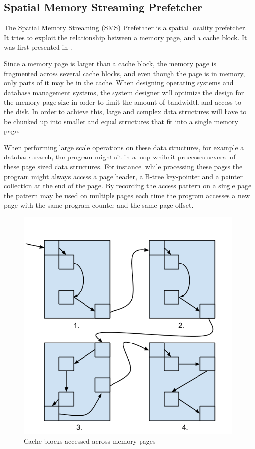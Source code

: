 \subsection{Spatial Memory Streaming Prefetcher}
\label{sec:smsPrefetcher}

The Spatial Memory Streaming (SMS) Prefetcher is a spatial locality
prefetcher. It tries to exploit the relationship between a memory page, and a cache block. It was first presented in \cite{SMS}.

Since a memory page is larger than a cache block, the memory page is
fragmented across several cache blocks, and even though the page is in
memory, only parts of it may be in the cache.  When designing
operating systems and database management systems, the system designer
will optimize the design for the memory page size in order to limit
the amount of bandwidth and access to the disk. In order to achieve
this, large and complex data structures will have to be chunked up into
smaller and equal structures that fit into a single memory page.

When performing large scale operations on these data structures, for
example a database search, the program might sit in a loop while it
processes several of these page sized data structures. For instance,
while processing these pages the program might always access a page
header, a B-tree key-pointer and a pointer collection at the end of
the page. By recording the access pattern on a single page the pattern may
be used on multiple pages each time the program accesses a new page
with the same program counter and the same page offset.

\begin{figure}[H]
  \centering
  \includegraphics[scale=0.35]{./figures/sms_pattern.png}
  \caption{Cache blocks accessed across memory pages}
  \label{fig:sms_pattern}
\end{figure}

